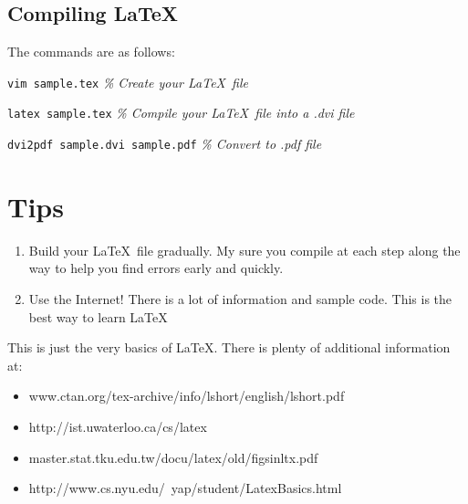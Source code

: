 \documentclass{article}[12pt]		    %
\begin{document}
\pagebreak %

\subsection{Compiling \LaTeX}
The commands are as follows:

\begin{description}
    \item {\tt vim sample.tex} \emph{ \% Create your \LaTeX\ file } 
    \item {\tt latex sample.tex} \emph{ \% Compile your \LaTeX\ file into a
    .dvi file } 
    \item {\tt dvi2pdf sample.dvi sample.pdf} \emph{ \% Convert to .pdf file } 
\end{description}

\section{Tips}  %

\begin{enumerate}
    \item Build your \LaTeX\ file gradually. My sure you compile at each step along the
    way to help you find errors early and quickly.
    \item Use the Internet!  There is a lot of information and sample code.  This is the best way to learn \LaTeX
\end{enumerate}

This is just the very basics of \LaTeX.  There is plenty of additional
information at:

\begin{itemize}
    \item www.ctan.org/tex-archive/info/lshort/english/lshort.pdf
    \item http://ist.uwaterloo.ca/cs/latex
    \item master.stat.tku.edu.tw/docu/latex/old/figsinltx.pdf
    \item http://www.cs.nyu.edu/~yap/student/LatexBasics.html
\end{itemize}
\end{document}
